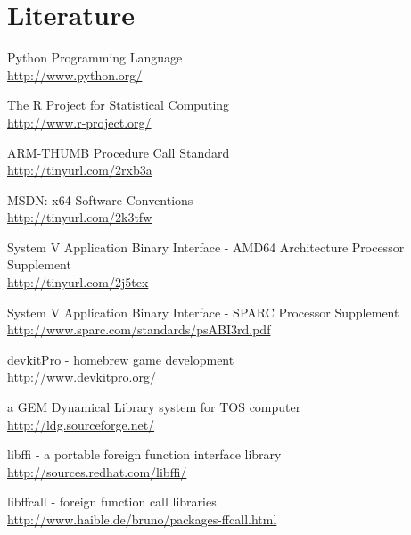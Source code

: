 %
%
%
%

\newpage

\section{Literature}

\begin{thebibliography}{9}
	Python Programming Language\\
	\url{http://www.python.org/}

	The R Project for Statistical Computing\\
	\url{http://www.r-project.org/}

	ARM-THUMB Procedure Call Standard\\
	\url{http://tinyurl.com/2rxb3a}

	MSDN: x64 Software Conventions\\
	\url{http://tinyurl.com/2k3tfw}

	System V Application Binary Interface - AMD64 Architecture Processor Supplement\\
	\url{http://tinyurl.com/2j5tex}

	System V Application Binary Interface - SPARC Processor Supplement\\
	\url{http://www.sparc.com/standards/psABI3rd.pdf}

	devkitPro - homebrew game development\\
	\url{http://www.devkitpro.org/}

	a GEM Dynamical Library system for TOS computer\\
	\url{http://ldg.sourceforge.net/}

	libffi - a portable foreign function interface library\\
	\url{http://sources.redhat.com/libffi/}

	libffcall - foreign function call libraries\\
	\url{http://www.haible.de/bruno/packages-ffcall.html}

\end{thebibliography}

